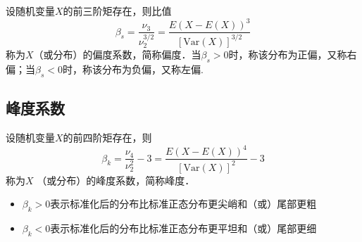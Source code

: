 \begin{definition}
    设随机变量$X$的前三阶矩存在，则比值
    $$
        \beta_{s}=\frac{\nu_{3}}{\nu_{2}^{3/2}}=\frac{E(X-E(X))^{3}}{\left[\mathrm{Var}(X)\right]^{3/2}}
    $$
    称为$X$（或分布）的偏度系数，简称偏度．当$\beta_s > 0$时，称该分布为正偏，又称右偏；当$\beta_s < 0$时，称该分布为负偏，又称左偏.

\end{definition}

\subsection{峰度系数}
\begin{definition}
    设随机变量$X$的前四阶矩存在，则
    $$
        \beta_{k}=\frac{\nu_{4}}{\nu_{2}^{2}}-3=\frac{E\left(X-E(X)\right)^{4}}{\left[\mathrm{Var}(X)\right]^{2}}-3
    $$
    称为$X$ （或分布）的峰度系数，简称峰度．
\end{definition}

\begin{itemize}
    \item $\beta_k >0$表示标准化后的分布比标准正态分布更尖峭和（或）尾部更粗
    \item $\beta_k < 0$表示标准化后的分布比标准正态分布更平坦和（或）尾部更细
\end{itemize}